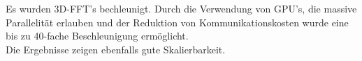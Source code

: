 Es wurden 3D-FFT's bechleunigt. Durch die Verwendung von GPU's, die massive Parallelität erlauben und der Reduktion von Kommunikationskosten wurde eine bis zu 40-fache Beschleunigung ermöglicht.\\
Die Ergebnisse zeigen ebenfalls gute Skalierbarkeit.\\


